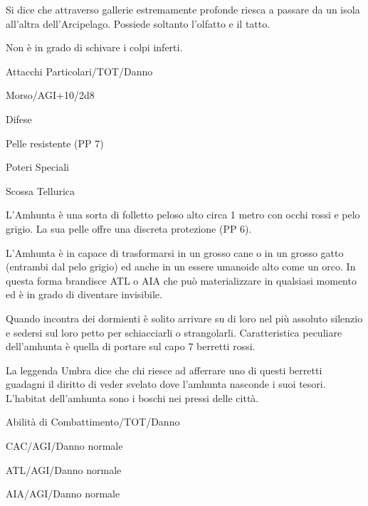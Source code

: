 Si dice che attraverso gallerie estremamente profonde riesca a passare
da un isola all'altra dell'Arcipelago.  Possiede soltanto l'olfatto e
il tatto.

Non \`e in grado di schivare i colpi inferti.
 

\begin{parmostro}{Attacchi Particolari/TOT/Danno}
\item Morso/AGI+10/2d8
\end{parmostro}

\begin{parmostro}{Difese}
\item Pelle resistente (PP 7)
\end{parmostro}

\begin{parmostro}{Poteri Speciali}
\item Scossa Tellurica
\end{parmostro}


L'Amhunta \`e una sorta di folletto peloso alto circa 1 metro con
occhi rossi e pelo grigio. La sua pelle offre una discreta protezione
(PP 6).

L'Amhunta \`e in capace di trasformarsi in un grosso cane o in un
grosso gatto (entrambi dal pelo grigio) ed anche in un essere umanoide
alto come un orco. In questa forma brandisce ATL o AIA che pu\`o
materializzare in qualsiasi momento ed \`e in grado di diventare
invisibile.

Quando incontra dei dormienti \`e solito arrivare su di
loro nel pi\`u assoluto silenzio e sedersi sul loro petto per
schiacciarli o strangolarli.  Caratteristica peculiare dell'amhunta
\`e quella di portare sul capo 7 berretti rossi. 

La leggenda Umbra dice che chi riesce ad afferrare uno di questi
berretti guadagni il diritto di veder svelato dove l'amhunta nasconde
i suoi tesori.  L'habitat dell'amhunta sono i boschi nei pressi delle
citt\`a. 

\begin{parmostro}{Abilit\`a di Combattimento/TOT/Danno}
\item CAC/AGI/Danno normale
\item ATL/AGI/Danno normale
\item  AIA/AGI/Danno normale
\end{parmostro}

